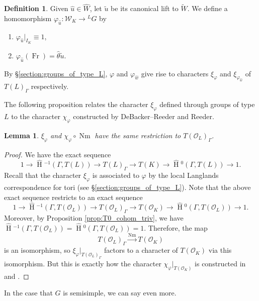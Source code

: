 \documentclass{mrlart7}
\theoremstyle{plain}
\newtheorem{lemma}[theorem]{Lemma}
\newcommand{\HT}[1]{\hat{\HH}{}^{#1}}
\theoremstyle{definition}
\newtheorem{definition}[theorem]{Definition}
\numberwithin{equation}{section}
\DeclareMathOperator{\HH}{H}
\DeclareMathOperator{\Nm}{Nm}
\DeclareMathOperator{\Fr}{Fr}
\newcommand{\OK}{\mathcal{O}_K}
\newcommand{\OL}{\mathcal{O}_L}
\newcommand{\Weil}{\mathcal{W}}
\begin{document}
\begin{definition} \label{def:phiu}
Given $\hat{u} \in \hat{W}$, let $\tilde{u}$ be its canonical lift to $\widetilde{W}$.
We define a homomorphism $\varphi_{\hat{u}} : \Weil_K \rightarrow {}^L G$ by
\begin{enumerate}
\item $\varphi_{\hat{u}}|_{I_K} \equiv 1$,
\item $\varphi_{\hat{u}}(\Fr) = \hat{\theta} \tilde{u}$.
\end{enumerate}
\end{definition}

By
\S\ref{section:groups_of_type_L}, $\varphi$ and $\varphi_{\hat{w}}$ give rise to characters
$\xi_{\varphi}$ and $\xi_{\varphi_{\hat{w}}}$ of $T(L)_{\Gamma}$ respectively.

The following proposition relates the character $\xi_\varphi$ defined through groups of type $L$
to the character $\chi_\varphi$ constructed by DeBacker--Reeder and Reeder.

\begin{lemma} \label{lem:GDR_compat}
$\xi_{\varphi}$ and $\chi_{\varphi} \circ \Nm$ have the same restriction to $T(\OL)_{\Gamma}$.
\end{lemma}

\begin{proof}
We have the exact sequence
$$1 \rightarrow \HT{-1}(\Gamma, T(L)) \rightarrow T(L)_{\Gamma} \rightarrow T(K)
  \rightarrow \HT{0}(\Gamma, T(L)) \rightarrow 1.$$
Recall that the character $\xi_{\varphi}$ is associated to $\varphi$ by
the local Langlands correspondence for tori (see \S\ref{section:groups_of_type_L}).
Note that the above exact sequence restricts to an exact sequence
$$1 \rightarrow \HT{-1}(\Gamma, T(\OL)) \rightarrow T(\OL)_{\Gamma}
  \rightarrow T(\OK) \rightarrow \HT{0}(\Gamma, T(\OL)) \rightarrow 1.$$
Moreover, by Proposition \ref{prop:T0_cohom_triv}, we have
$\HT{-1}(\Gamma, T(\OL)) = \HT{0}(\Gamma, T(\OL)) = 1$.
Therefore, the map
$$T(\OL)_{\Gamma} \xrightarrow{\Nm} T(\OK)$$
is an isomorphism, so
$\xi_{\varphi}|_{T(\OL)_{\Gamma}}$ factors to a character of
$T(\OK)$ via this isomorphism.  But this is exactly how the character
$\chi_{\varphi}|_{T(\OK)}$ is constructed in \cite{reeder-debacker:09a} and \cite{reeder:08a}.
\end{proof}

In the case that $G$ is semisimple, we can say even more.
\end{document}
